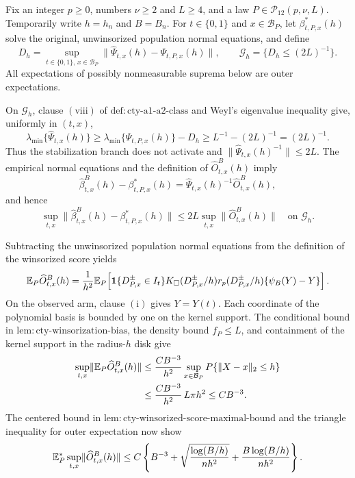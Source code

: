 Fix an integer \(p\geq0\), numbers \(\nu\geq2\) and \(L\geq4\), and a law \(P\in\mathcal P_{12}(p,\nu,L)\).  Temporarily write \(h=h_n\) and \(B=B_n\).  For \(t\in\{0,1\}\) and \(x\in\mathcal B_P\), let \(\beta^*_{t,P,x}(h)\) solve the original, unwinsorized population normal equations, and define
\[
 D_h=\sup_{t\in\{0,1\},\,x\in\mathcal B_P}
 \lVert\widehat\Psi_{t,x}(h)-\Psi_{t,P,x}(h)\rVert,
 \qquad
 \mathcal G_h=\{D_h\leq(2L)^{-1}\}.
\]
All expectations of possibly nonmeasurable suprema below are outer expectations.

On \(\mathcal G_h\), clause \(\mathrm{(viii)}\) of \(\mathrm{def:cty\text{-}a1\text{-}a2\text{-}class}\) and Weyl's eigenvalue inequality give, uniformly in \((t,x)\),
\[
 \lambda_{\min}\{\widehat\Psi_{t,x}(h)\}
 \geq \lambda_{\min}\{\Psi_{t,P,x}(h)\}-D_h
 \geq L^{-1}-(2L)^{-1}=(2L)^{-1}.
\]
Thus the stabilization branch does not activate and
\(\lVert\widehat\Psi_{t,x}(h)^{-1}\rVert\leq2L\).  The empirical normal equations and the definition of \(\widehat O^B_{t,x}(h)\) imply
\[
 \widehat\beta^B_{t,x}(h)-\beta^*_{t,P,x}(h)
 =\widehat\Psi_{t,x}(h)^{-1}\widehat O^B_{t,x}(h),
\]
and hence
\[
 \sup_{t,x}\lVert\widehat\beta^B_{t,x}(h)-\beta^*_{t,P,x}(h)\rVert
 \leq 2L\sup_{t,x}\lVert\widehat O^B_{t,x}(h)\rVert
 \quad\text{on }\mathcal G_h.
\]

Subtracting the unwinsorized population normal equations from the definition of the winsorized score yields
\[
 \mathbb E_P\widehat O^B_{t,x}(h)
 ={1\over h^2}\mathbb E_P\!\left[
 \mathbf1\{D^{\pm}_{P,x}\in I_t\}K_\square(D^{\pm}_{P,x}/h)
 r_p(D^{\pm}_{P,x}/h)\{\psi_B(Y)-Y\}
 \right].
\]
On the observed arm, clause \(\mathrm{(i)}\) gives \(Y=Y(t)\).  Each coordinate of the polynomial basis is bounded by one on the kernel support.  The conditional bound in \(\mathrm{lem:cty\text{-}winsorization\text{-}bias}\), the density bound \(f_P\leq L\), and containment of the kernel support in the radius-\(h\) disk give
\[
\begin{split}
 \sup_{t,x}\lVert\mathbb E_P\widehat O^B_{t,x}(h)\rVert
 &\leq {CB^{-3}\over h^2}
 \sup_{x\in\mathcal B_P}P\{\lVert X-x\rVert_2\leq h\}\\
 &\leq {CB^{-3}\over h^2}\,L\pi h^2
 \leq CB^{-3}.
\end{split}
\]
The centered bound in \(\mathrm{lem:cty\text{-}winsorized\text{-}score\text{-}maximal\text{-}bound}\) and the triangle inequality for outer expectation now show
\[
 \mathbb E_P^*\sup_{t,x}\lVert\widehat O^B_{t,x}(h)\rVert
 \leq C\left\{B^{-3}+\sqrt{{\log(B/h)\over nh^2}}
 +{B\log(B/h)\over nh^2}\right\}.
\]

